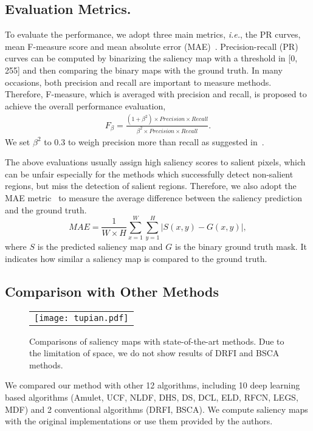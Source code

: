 \documentclass[journal]{IEEEtran}
\begin{document}
\subsection{Evaluation Metrics.}
To evaluate the performance, we adopt three main metrics, \emph{i.e.}, the PR curves, mean F-measure score and mean absolute error (MAE)~\cite{Borji2015Salient}.
Precision-recall (PR) curves can be computed by binarizing the saliency map with a threshold in [0, 255] and then comparing the binary maps with the ground truth.
In many occasions, both precision and recall are important to measure methods.
Therefore, F-measure, which is averaged with precision and recall, is proposed to achieve the overall performance evaluation,
\begin{align}
F_{\beta} =\frac{(1+\beta^2)\times Precision\times Recall}{\beta^2\times Precision \times Recall}.
\end{align}
We set $\beta ^2$ to 0.3 to weigh precision more than recall as suggested in~\cite{Achanta2009Frequency,Borji2015What,Wang2015Deep}.

The above evaluations usually assign high saliency scores to salient pixels, which can be unfair especially for the methods which successfully detect non-salient regions, but miss the detection of salient regions.
Therefore, we also adopt the MAE metric~\cite{Borji2015Salient} to measure the average difference between the saliency prediction and the ground truth.
\begin{equation}
MAE =\frac{1}{W\times H}\sum_{x=1}^{W}\sum_{y=1}^{H}|S(x,y) - G(x,y)|,
\end{equation}
where $S$ is the predicted saliency map and $G$ is the binary ground truth mask.
It indicates how similar a saliency map is compared to the ground truth.
\vspace{-2mm}
\subsection{Comparison with Other Methods}
\begin{figure*}[!t]
\begin{center}
\begin{tabular}{@{}c}
\texttt{[image: tupian.pdf]}
\end{tabular}
{\caption{Comparisons of saliency maps with state-of-the-art methods. Due to the limitation of space, we do not show results of DRFI and BSCA methods.}
\label{Fig saliency}}
\vspace{-6mm}
\end{center}
\end{figure*}
We compared our method with other 12 algorithms, including 10 deep learning based algorithms
(Amulet\cite{Zhang2017Amulet}, UCF\cite{Zhang2017Learning}, NLDF\cite{Luo2017Non}, DHS\cite{Liu2016DHSNet}, DS\cite{Li2015DeepSaliency}, DCL\cite{Li2016Deep}, ELD\cite{Lee2016Deep}, RFCN\cite{Wang2016Saliency}, LEGS\cite{Wang2015Deep}, MDF\cite{Li2015Visual}) and 2 conventional  algorithms (DRFI\cite{Jiang2013Salient}, BSCA\cite{Qin2015Saliency}).
We compute saliency maps with the original implementations or use them provided by the authors.
\end{document}
